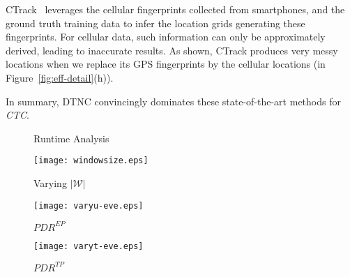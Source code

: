 \documentclass{vldb}
\begin{document}
	CTrack~\cite{thiagarajan2011accurate} leverages the cellular fingerprints collected from smartphones, and the ground truth training data to infer the location grids generating these fingerprints. 
	For cellular data, such information can only be approximately derived, leading to inaccurate results.
	As shown, CTrack produces very messy locations when we replace its GPS fingerprints by the cellular locations (in Figure~\ref{fig:eff-detail}(h)).
	
	In summary, DTNC convincingly dominates these state-of-the-art methods for \textit{CTC}.	
	
	\begin{figure*}[!htbp]
		\begin{minipage}[b]{0.49\columnwidth}
			\vspace{-8pt}
			\caption{Runtime Analysis}
			\label{fig:rt-ana}
		\end{minipage}
		\begin{minipage}[b]{0.49\columnwidth}
			\centering
			\texttt{[image: windowsize.eps]}
			\vspace{-8pt}
			\caption{Varying $|\mathcal{W}|$}
			\label{fig:varying-w}
		\end{minipage}
		\hfill
		\begin{minipage}[b]{0.49\columnwidth}
			\centering
			\texttt{[image: varyu-eve.eps]}
			\vspace{-8pt}
			\caption{$PDR^{EP}$}
			\label{fig:eva-emis:vary-u}
		\end{minipage}
		\begin{minipage}[b]{0.49\columnwidth}
			\centering
			\texttt{[image: varyt-eve.eps]}
			\vspace{-8pt}
			\caption{$PDR^{TP}$}
			\label{fig:trans-prob:vt}
		\end{minipage}
		
	\end{figure*}
	
	
	
\end{document}
